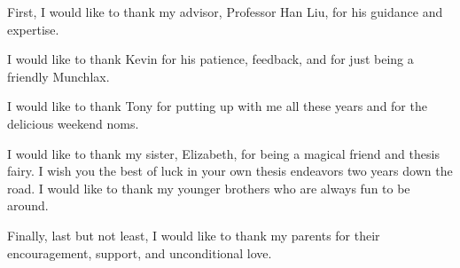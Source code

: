 
First, I would like to thank my advisor, Professor Han Liu, for his 
guidance and expertise.

I would like to thank Kevin for his patience, feedback, and for 
just being a friendly Munchlax. 

I would like to thank Tony for putting up with me all these years and for the 
delicious weekend noms.

I would like to thank my sister, Elizabeth, for being a magical friend 
and thesis fairy. I wish you the best of luck in your own thesis endeavors two 
years down the road. 
I would like to thank my younger brothers who are always fun to be around.

Finally, last but not least, I would like to thank my parents for their 
encouragement, support, and unconditional love. 